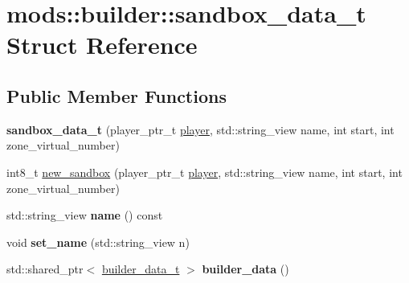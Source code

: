 \hypertarget{structmods_1_1builder_1_1sandbox__data__t}{}\section{mods\+:\+:builder\+:\+:sandbox\+\_\+data\+\_\+t Struct Reference}
\label{structmods_1_1builder_1_1sandbox__data__t}
\subsection*{Public Member Functions}
\begin{DoxyCompactItemize}
\item 
\mbox{\label{structmods_1_1builder_1_1sandbox__data__t_a86f288d0842cab1bbc1985fec7981472}} 
{\bfseries sandbox\+\_\+data\+\_\+t} (player\+\_\+ptr\+\_\+t \hyperlink{classmods_1_1player}{player}, std\+::string\+\_\+view name, int start, int zone\+\_\+virtual\+\_\+number)
\item 
int8\+\_\+t \hyperlink{structmods_1_1builder_1_1sandbox__data__t_a81812059faef958893cbd7e0651af226}{new\+\_\+sandbox} (player\+\_\+ptr\+\_\+t \hyperlink{classmods_1_1player}{player}, std\+::string\+\_\+view name, int start, int zone\+\_\+virtual\+\_\+number)
\item 
\mbox{\label{structmods_1_1builder_1_1sandbox__data__t_a66110e5e9fcda0698fa6b017a08a1d3d}} 
std\+::string\+\_\+view {\bfseries name} () const
\item 
\mbox{\label{structmods_1_1builder_1_1sandbox__data__t_a50c8fe735b9874e802f62e87d612696e}} 
void {\bfseries set\+\_\+name} (std\+::string\+\_\+view n)
\item 
\mbox{\label{structmods_1_1builder_1_1sandbox__data__t_a19ed3a0c5d67fd70ae2e251ac04e9e04}} 
std\+::shared\+\_\+ptr$<$ \hyperlink{structbuilder__data__t}{builder\+\_\+data\+\_\+t} $>$ {\bfseries builder\+\_\+data} ()
\end{DoxyCompactItemize}
